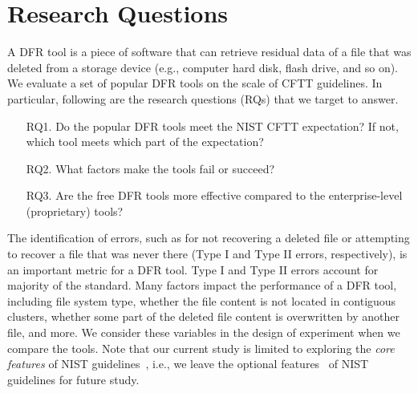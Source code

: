 \section{Research Questions}

A DFR tool is a piece of software that can retrieve residual data of a file that was deleted 
from a storage device (e.g., computer hard disk, flash drive, and so on). We evaluate a set of 
popular DFR tools on the scale of CFTT guidelines. 
In particular, following are the research questions (RQs) that we target to answer. 

\begin{itemize}
\item[RQ1.] Do the popular DFR tools meet the NIST CFTT expectation? 
If not, which tool meets which part of the expectation? 

\item[RQ2.] What factors make the tools fail or succeed?

\item[RQ3.] Are the free DFR tools more effective compared to the enterprise-level (proprietary) tools?
\end{itemize}

The identification of errors, such as for not recovering a deleted file or attempting to recover a file that was never there 
(Type I and Type II errors, respectively), is an important metric for a DFR tool. 
Type I and Type II errors account for majority of the standard. Many factors impact the performance of a DFR tool, 
including file system type, whether the file content is not located in contiguous clusters, whether 
some part of the deleted file content is overwritten by another file, and more.
We consider these variables in the design of experiment when we compare the tools.
Note that our current study is limited to exploring the \emph{core features} of NIST guidelines~\cite{meta:dfr:standards}, 
i.e., we leave the optional features~\cite{meta:dfr:standards} of NIST guidelines for future study.

